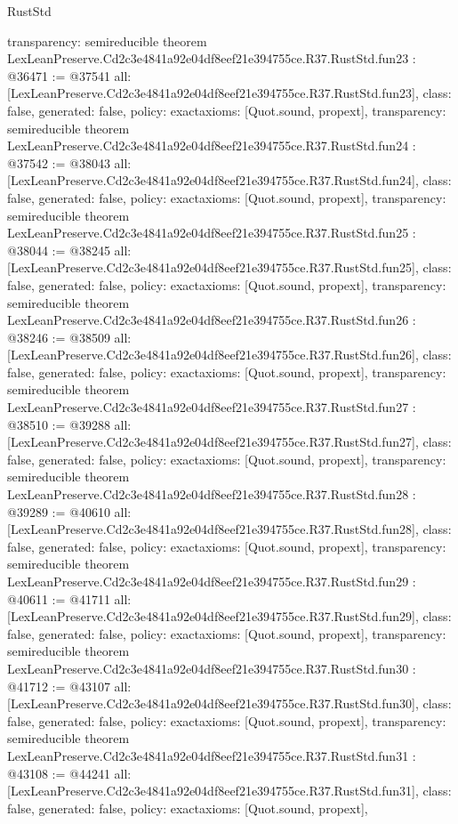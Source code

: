 \begin{lexlean}{RustStd}
\begin{coremodule}
{  transparency: semireducible
}
theorem LexLeanPreserve.Cd2c3e4841a92e04df8eef21e394755ce.R37.RustStd.fun23 : @36471 := @37541 {
  all: [LexLeanPreserve.Cd2c3e4841a92e04df8eef21e394755ce.R37.RustStd.fun23],
  class: false,
  generated: false,
  policy: exact{axioms: [Quot.sound, propext]},
  transparency: semireducible
}
theorem LexLeanPreserve.Cd2c3e4841a92e04df8eef21e394755ce.R37.RustStd.fun24 : @37542 := @38043 {
  all: [LexLeanPreserve.Cd2c3e4841a92e04df8eef21e394755ce.R37.RustStd.fun24],
  class: false,
  generated: false,
  policy: exact{axioms: [Quot.sound, propext]},
  transparency: semireducible
}
theorem LexLeanPreserve.Cd2c3e4841a92e04df8eef21e394755ce.R37.RustStd.fun25 : @38044 := @38245 {
  all: [LexLeanPreserve.Cd2c3e4841a92e04df8eef21e394755ce.R37.RustStd.fun25],
  class: false,
  generated: false,
  policy: exact{axioms: [Quot.sound, propext]},
  transparency: semireducible
}
theorem LexLeanPreserve.Cd2c3e4841a92e04df8eef21e394755ce.R37.RustStd.fun26 : @38246 := @38509 {
  all: [LexLeanPreserve.Cd2c3e4841a92e04df8eef21e394755ce.R37.RustStd.fun26],
  class: false,
  generated: false,
  policy: exact{axioms: [Quot.sound, propext]},
  transparency: semireducible
}
theorem LexLeanPreserve.Cd2c3e4841a92e04df8eef21e394755ce.R37.RustStd.fun27 : @38510 := @39288 {
  all: [LexLeanPreserve.Cd2c3e4841a92e04df8eef21e394755ce.R37.RustStd.fun27],
  class: false,
  generated: false,
  policy: exact{axioms: [Quot.sound, propext]},
  transparency: semireducible
}
theorem LexLeanPreserve.Cd2c3e4841a92e04df8eef21e394755ce.R37.RustStd.fun28 : @39289 := @40610 {
  all: [LexLeanPreserve.Cd2c3e4841a92e04df8eef21e394755ce.R37.RustStd.fun28],
  class: false,
  generated: false,
  policy: exact{axioms: [Quot.sound, propext]},
  transparency: semireducible
}
theorem LexLeanPreserve.Cd2c3e4841a92e04df8eef21e394755ce.R37.RustStd.fun29 : @40611 := @41711 {
  all: [LexLeanPreserve.Cd2c3e4841a92e04df8eef21e394755ce.R37.RustStd.fun29],
  class: false,
  generated: false,
  policy: exact{axioms: [Quot.sound, propext]},
  transparency: semireducible
}
theorem LexLeanPreserve.Cd2c3e4841a92e04df8eef21e394755ce.R37.RustStd.fun30 : @41712 := @43107 {
  all: [LexLeanPreserve.Cd2c3e4841a92e04df8eef21e394755ce.R37.RustStd.fun30],
  class: false,
  generated: false,
  policy: exact{axioms: [Quot.sound, propext]},
  transparency: semireducible
}
theorem LexLeanPreserve.Cd2c3e4841a92e04df8eef21e394755ce.R37.RustStd.fun31 : @43108 := @44241 {
  all: [LexLeanPreserve.Cd2c3e4841a92e04df8eef21e394755ce.R37.RustStd.fun31],
  class: false,
  generated: false,
  policy: exact{axioms: [Quot.sound, propext]},
}
\end{coremodule}
\end{lexlean}
